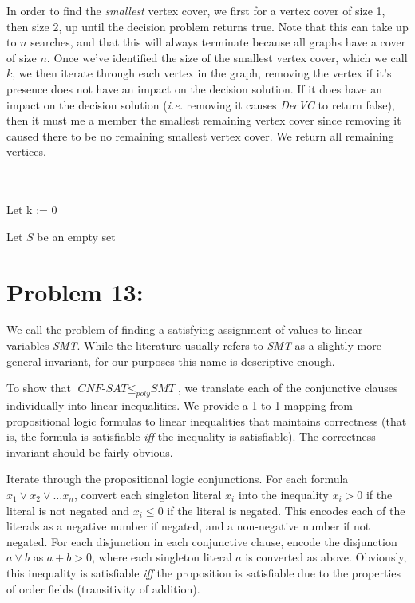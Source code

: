 \documentclass[12pt]{article}
\begin{document}
In order to find the \textit{smallest} vertex cover, we first for a vertex cover of size 1, then size 2, up until the decision problem returns true. Note that this can take up to $n$ searches, and that this will always terminate because all graphs have a cover of size $n$. Once we've identified the size of the smallest vertex cover, which we call $k$, we then iterate through each vertex in the graph, removing the vertex if it's presence does not have an impact on the decision solution. If it does have an impact on the decision solution (\textit{i.e.} removing it causes \textit{DecVC} to return false), then it must me a member the smallest remaining vertex cover since removing it caused there to be no remaining smallest vertex cover. We return all remaining vertices.

\begin{algorithm}[H]
\\
\\

Let k := 0

Let $S$ be an empty set

\end{algorithm}


\section*{Problem 13:}

We call the problem of finding a satisfying assignment of values to linear variables \textit{SMT}. While the literature usually refers to \textit{SMT} as a slightly more general invariant, for our purposes this name is descriptive enough. 

To show that $\textit{CNF-SAT} \leq_{poly} \textit{SMT}$, we translate each of the conjunctive clauses individually into linear inequalities. We provide a 1 to 1 mapping from propositional logic formulas to linear inequalities that maintains correctness (that is, the formula is satisfiable \textit{iff} the inequality is satisfiable). The correctness invariant should be fairly obvious.

Iterate through the propositional logic conjunctions. For each formula $x_{1} \vee x_{2} \vee \dots x_{n}$, convert each singleton literal $x_{i}$ into the inequality $x_{i} > 0$ if the literal is not negated and $x_{i} \leq 0 $ if the literal is negated. This encodes each of the literals as a negative number if negated, and a non-negative number if not negated. For each disjunction in each conjunctive clause, encode the disjunction $a \vee b$ as $a + b > 0$, where each singleton literal $a$ is converted as above. Obviously, this inequality is satisfiable \textit{iff} the proposition is satisfiable due to the properties of order fields (transitivity of addition).
\end{document}
